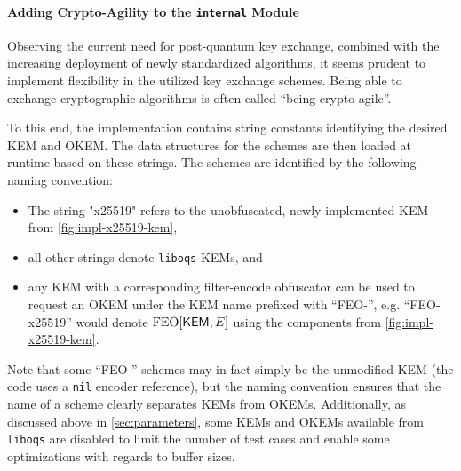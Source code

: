 \paragraph{Adding Crypto-Agility to the \texttt{internal} Module}

Observing the current need for post-quantum key exchange, combined with the increasing deployment of newly standardized algorithms, it seems prudent to implement flexibility in the utilized key exchange schemes. Being able to exchange cryptographic algorithms is often called ``being crypto-agile''.

To this end, the \drivel{} implementation contains string constants identifying the desired KEM and OKEM. The data structures for the schemes are then loaded at runtime based on these strings.
The schemes are identified by the following naming convention:
\begin{itemize}
    \item The string "x25519" refers to the unobfuscated, newly implemented KEM from \cref{fig:impl-x25519-kem},
    \item all other strings denote \texttt{liboqs} KEMs, and
    \item any KEM with a corresponding filter-encode obfuscator can be used to request an OKEM under the KEM name prefixed with ``FEO-'', e.g. ``FEO-x25519'' would denote $\textsf{\textnormal{FEO}}[\mathsf{KEM}, E]$ using the components from \cref{fig:impl-x25519-kem}.
\end{itemize}

Note that some ``FEO-'' schemes may in fact simply be the unmodified KEM (the code uses a \texttt{nil} encoder reference), but the naming convention ensures that the name of a scheme clearly separates KEMs from OKEMs. Additionally, as discussed above in \cref{sec:parameters}, some KEMs and OKEMs available from \texttt{liboqs} are disabled to limit the number of test cases and enable some optimizations with regards to buffer sizes.

